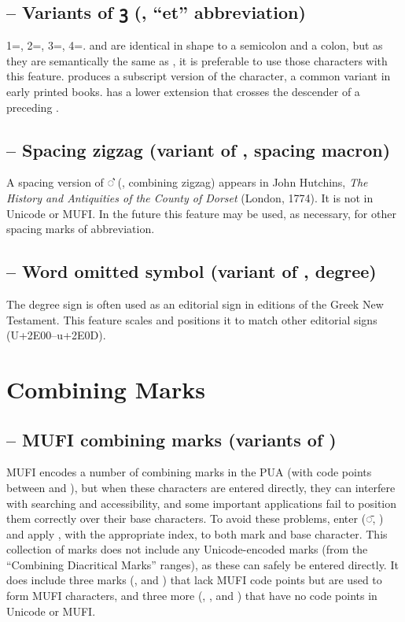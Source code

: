 \subsection{ – Variants of ꝫ (, “et” abbreviation)}
1=, 2=, 3=, 4=. \textSourceText{[1]} and \textSourceText{[3]} are
identical in shape to a semicolon and a colon, but as they are semantically the same as ,
it is preferable to use those
characters with this feature. \textSourceText{[2]} produces a subscript version of
the character, a common variant in early printed books. \textSourceText{[4]} has a lower extension that
crosses the descender of a preceding .

\subsection{ – Spacing zigzag (variant of , spacing macron)}
A spacing version of ◌͛ (, combining zigzag) appears in John Hutchins,
\textit{The History and Antiquities of the County of Dorset} (London, 1774). It
is not in Unicode or MUFI. In the future this feature may be used, as necessary,
for other spacing marks of abbreviation.

\subsection{ – Word omitted symbol (variant of , degree)}
The degree sign is often used as an editorial sign in editions of the Greek New Testament. This feature
scales and positions it to match other editorial signs (U+2E00--u+2E0D).

\section{Combining Marks}
\subsection{ – MUFI combining marks (variants of )}\hypertarget{cv84}{}
MUFI encodes a number of combining marks in the PUA (with code points between  and ), but when these characters
are entered directly, they can interfere with searching and accessibility, and some important applications fail to
position them correctly over their base characters. To avoid these problems, enter  (◌̄, ) and apply , with the appropriate index, to both mark and base character. This
collection of marks does not include any Unicode-encoded marks (from the “Combining Diacritical Marks” ranges), as
these can safely be entered directly. It does include three marks (,
\textSourceText{[31]} and \textSourceText{[32]}) that lack MUFI code points but are used to form MUFI
characters, and three more (\textSourceText{[2]}, \textSourceText{[33]},
and \textSourceText{[34]}) that have no code points in Unicode or MUFI.

